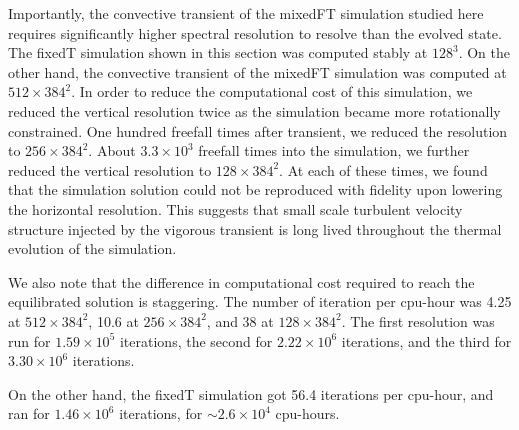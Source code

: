 \documentclass[aps, pre, onecolumn, nofootinbib, notitlepage, groupedaddress, amsfonts, amssymb, amsmath, longbibliography]{revtex4-1}
\begin{document}
Importantly, the convective transient of the mixedFT simulation studied here requires significantly higher spectral resolution to resolve than the evolved state.
The fixedT simulation shown in this section was computed stably at $128^3$.
On the other hand, the convective transient of the mixedFT simulation was computed at $512\times384^2$.
In order to reduce the computational cost of this simulation, we reduced the vertical resolution twice as the simulation became more rotationally constrained.
One hundred freefall times after transient, we reduced the resolution to $256\times384^2$.
About $3.3 \times 10^3$ freefall times into the simulation, we further reduced the vertical resolution to $128\times384^2$.
At each of these times, we found that the simulation solution could not be reproduced with fidelity upon lowering the horizontal resolution.
This suggests that small scale turbulent velocity structure injected by the vigorous transient is long lived throughout the thermal evolution of the simulation.

We also note that the difference in computational cost required to reach the equilibrated solution is staggering.
The number of iteration per cpu-hour was 4.25 at $512\times384^2$, 10.6 at $256\times384^2$, and 38 at $128\times384^2$.
The first resolution was run for $1.59 \times 10^5$ iterations, the second for $2.22 \times 10^6$ iterations, and the third for $3.30 \times 10^6$ iterations.

On the other hand, the fixedT simulation got 56.4 iterations per cpu-hour, and ran for $1.46 \times 10^6$ iterations, for $\sim 2.6 \times 10^4$ cpu-hours.
\end{document}
